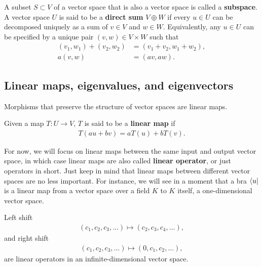 A subset $S \subset V$ of a vector space that is also a vector space is called a {\bf subspace}.
A vector space $U$ is said to be a {\bf direct sum} $V\oplus W$ if every $u\in U$ can be decomposed uniquely as a sum of $v\in V$ and $w\in W$.
Equivalently, any $u\in U$ can be specified by a unique pair $(v,w)\in V\times W$ such that
\begin{align}
	(v_1,w_1) + (v_2,w_2) &= (v_1+v_2,w_1+w_2), \label{direct-sum-add}\\
	a(v,w) &= (av,aw). \label{direct-sum-scalar}
\end{align}


\subsection{Linear maps, eigenvalues, and eigenvectors}

Morphisms that preserve the structure of vector spaces are linear maps.
\begin{definition}
	Given a map $T:U\to V$,
	$T$ is said to be a {\bf linear map} if
	\begin{align}
		T(au + bv) = aT(u) + bT(v).
	\end{align}
\end{definition}

\noindent For now, we will focus on linear maps between the same input and output vector space, in which case linear maps are also called {\bf linear operator}, or just operators in short. Just keep in mind that linear maps between different vector spaces are no less important. For instance, we will see in a moment that a bra $\bra{u}$ is a linear map from a vector space over a field $K$ to $K$ itself, a one-dimensional vector space. 

\begin{example}
	Left shift
	\begin{align}
		(c_1,c_2,c_3,\dots) \mapsto (c_2,c_3,c_4,\dots),\label{eq:left-shift}
	\end{align}
	and right shift
	\begin{align}
		(c_1,c_2,c_3,\dots) \mapsto (0,c_1,c_2,\dots),\label{eq:right-shift}
	\end{align}
	are linear operators in an infinite-dimensional vector space.
\end{example}

